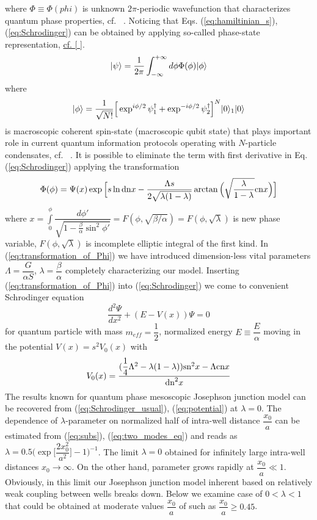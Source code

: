 \documentclass[aps,prl,preprint,groupedaddress]{revtex4-1}
\DeclarePairedDelimiter\ket{\lvert}{\rangle}
\begin{document}
where $\Phi \equiv \Phi(phi)$ is  unknown $2\pi$-periodic wavefunction that characterizes quantum phase properties, cf. ~\cite{40}. Noticing that Eqs. (\ref{eq:hamiltinian_s}), (\ref{eq:Schrodinger}) can be obtained by applying  so-called phase-state representation, \underline{cf. [  ]}.
\begin{equation}
\ket{\psi} = \dfrac{1}{2\pi}\int_{-\infty}^{+\infty}d\phi\Phi(\phi)\ket{\phi}
\end{equation}
where
\begin{equation}
\ket{\phi} = \dfrac{1}{\sqrt{N!}}\Big[\exp^{i\phi/2}\psi_1^\dagger+\exp^{-i\phi/2}\psi_2^\dag\Big]^N\ket{0}_1\ket{0}
\end{equation}
is macroscopic coherent spin-state (macroscopic qubit state)  that plays important role in current quantum information protocols operating with $N$-particle condensates, cf. ~\cite{41}.
It is possible to eliminate the term with first derivative in  Eq.(\ref{eq:Schrodinger}) applying the transformation
\begin{equation}
\Phi(\phi) = \Psi(x)\exp\Big[s\ln\textrm{dn}{x}-\dfrac{\Lambda s}{2\sqrt{\lambda(1-\lambda)}}\arctan\Big(\sqrt{\dfrac{\lambda}{1-\lambda}}\textrm{cn}{x}\Big)\Big]
\label{eq:transformation_of_Phi}
\end{equation}
where $x = \int \limits_0^\phi \dfrac{d \phi'}{\sqrt{1 - \frac{\beta}{\alpha} \sin^2 \phi'}} = F(\phi, \sqrt{\beta / \alpha}) = F(\phi, \sqrt{\lambda})$ is new phase variable, $F(\phi, \sqrt{\lambda})$ is incomplete elliptic integral of the first kind.  In (\ref{eq:transformation_of_Phi}) we have introduced dimension-less vital parameters $\Lambda = \dfrac{G}{\alpha S}$, $\lambda = \dfrac{\beta}{\alpha}$ completely characterizing our model.
Inserting (\ref{eq:transformation_of_Phi}) into (\ref{eq:Schrodinger}) we come to  convenient Schrodinger equation
\begin{equation}
\dfrac{d^2\Psi}{dx^2} + (E - V(x))\Psi = 0
\label{eq:Schrodinger_usual}
\end{equation}
for quantum particle with mass $m_{eff} = \dfrac{1}{2}$,  normalized energy $E \equiv \dfrac{E}{\alpha}$ moving in the potential $V(x) = s^2V_0(x)$ with
\begin{equation}
V_0(x) = \dfrac{(\dfrac{1}{4}\Lambda^2-\lambda(1-\lambda))\textrm{sn}^2{x}-\Lambda\textrm{cn}{x}}{\textrm{dn}^2{x}}
\label{eq:potential}
\end{equation}
The results  known for quantum phase mesoscopic Josephson junction model can be recovered  from  (\ref{eq:Schrodinger_usual}), (\ref{eq:potential}) at $\lambda = 0$. 
The dependence of $\lambda$-parameter  on  normalized  half of intra-well distance $\dfrac{x_0}{a}$ can be estimated from    (\ref{eq:subs}), (\ref{eq:two_modes_eq}) and reads as $\lambda = 0.5\Big(\exp\Big[\dfrac{2x_0^2}{a^2}\Big]-1\Big)^{-1}$. The limit $\lambda = 0$ obtained for infinitely large intra-well distances $x_0 \to \infty$. On the other hand, parameter grows rapidly at $\dfrac{x_0}{a} \ll 1$. Obviously, in this limit our Josephson junction model inherent based on relatively weak coupling between wells breaks down. Below we  examine case of $0 < \lambda < 1$ that could be obtained at moderate values $\dfrac{x_0}{a}$ of such as $\dfrac{x_0}{a} \geq 0.45$. 
\end{document}
